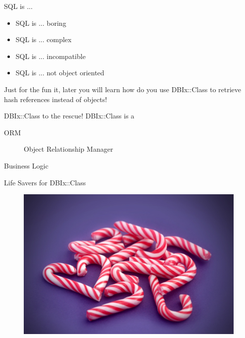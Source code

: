 \begin{frame}{SQL is ...}
\begin{itemize}
\item SQL is ... boring
\item SQL is ... complex
\item SQL is ... incompatible
\item SQL is ... not object oriented
\end{itemize}
\end{frame}


Just for the fun it, later you will learn how do you
use DBIx::Class to retrieve hash references instead of
objects!

\begin{frame}{DBIx::Class to the rescue!}
\centering
DBIx::Class is a
\begin{description}
\item[ORM] Object Relationship Manager
\end{description}
\end{frame}

\begin{frame}{Business Logic}
\end{frame}

\begin{frame}{Life Savers for DBIx::Class}
\begin{figure}[!ht]
\centering
\includegraphics[width=0.8\linewidth]{img/candy-cane.jpg}
\end{figure}
\end{frame}

